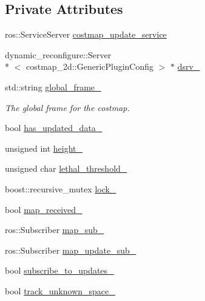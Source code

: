 \subsection*{Private Attributes}
\begin{DoxyCompactItemize}
\item 
ros\-::\-Service\-Server \hyperlink{classcostmap__2d_1_1RappStaticLayer_abc6ece9e63ad19b730e6212175e5b09a}{costmap\-\_\-update\-\_\-service}
\item 
dynamic\-\_\-reconfigure\-::\-Server\\*
$<$ costmap\-\_\-2d\-::\-Generic\-Plugin\-Config $>$ $\ast$ \hyperlink{classcostmap__2d_1_1RappStaticLayer_a81284848f241f743f0ade2d9253157f8}{dsrv\-\_\-}
\item 
std\-::string \hyperlink{classcostmap__2d_1_1RappStaticLayer_a30e8c9d0097e7cbcc22fa4f8ab60d896}{global\-\_\-frame\-\_\-}
\begin{DoxyCompactList}\small\item\em The global frame for the costmap. \end{DoxyCompactList}\item 
bool \hyperlink{classcostmap__2d_1_1RappStaticLayer_a7e1b829620b5d72827c398279d0cacee}{has\-\_\-updated\-\_\-data\-\_\-}
\item 
unsigned int \hyperlink{classcostmap__2d_1_1RappStaticLayer_a1e8fa4631dfd2c0973498acffdde25f0}{height\-\_\-}
\item 
unsigned char \hyperlink{classcostmap__2d_1_1RappStaticLayer_aca5230d14fdd4ad09de3c22b3488a2e6}{lethal\-\_\-threshold\-\_\-}
\item 
boost\-::recursive\-\_\-mutex \hyperlink{classcostmap__2d_1_1RappStaticLayer_ab8eef08e36456dbd1ca2291600d6dc23}{lock\-\_\-}
\item 
bool \hyperlink{classcostmap__2d_1_1RappStaticLayer_abe9f1fbe3e0a5f77fb5c20352dc8fd7d}{map\-\_\-received\-\_\-}
\item 
ros\-::\-Subscriber \hyperlink{classcostmap__2d_1_1RappStaticLayer_a3ec9bdcd0e1fd00e0413ca2ace33213c}{map\-\_\-sub\-\_\-}
\item 
ros\-::\-Subscriber \hyperlink{classcostmap__2d_1_1RappStaticLayer_a2a347b65373e54e1755412c145115369}{map\-\_\-update\-\_\-sub\-\_\-}
\item 
bool \hyperlink{classcostmap__2d_1_1RappStaticLayer_ae11ef5367996ffd66dc4e42d510e8cb8}{subscribe\-\_\-to\-\_\-updates\-\_\-}
\item 
bool \hyperlink{classcostmap__2d_1_1RappStaticLayer_a59bbc6d857f64db82fba12d6738b64b9}{track\-\_\-unknown\-\_\-space\-\_\-}

\end{DoxyCompactItemize}
